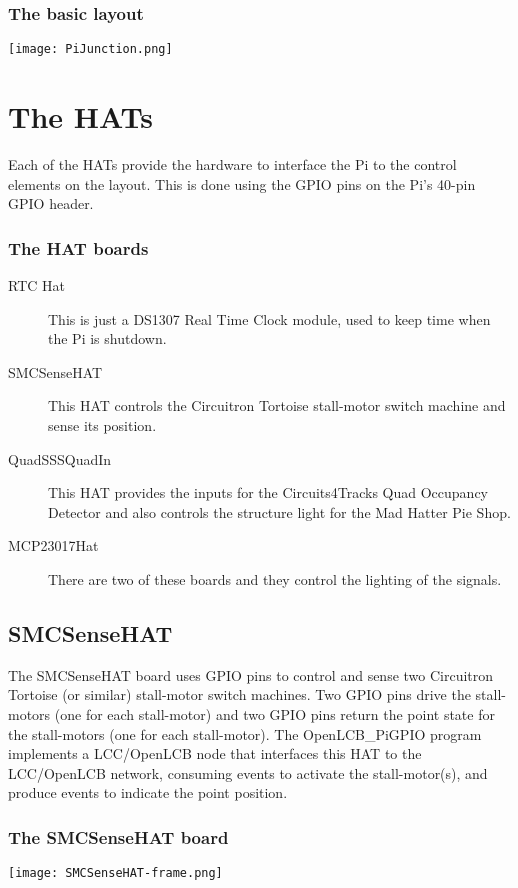 \begin{frame}
   \frametitle{The basic layout}
   \texttt{[image: PiJunction.png]}
\end{frame}

\section{The HATs}

Each of the HATs provide the hardware to interface the Pi to the control
elements on the layout. This is done using the GPIO pins on the Pi's 40-pin
GPIO header.  

\begin{frame}
   \frametitle{The HAT boards}
   \begin{description}
   \item[RTC Hat] This is just a DS1307 Real Time Clock module, used to keep 
   time when the Pi is shutdown.
   \item[SMCSenseHAT] This HAT controls the Circuitron Tortoise stall-motor 
   switch machine and sense its position.
   \item[QuadSSSQuadIn] This HAT provides the inputs for the Circuits4Tracks 
   Quad Occupancy Detector and also controls the structure light for the Mad 
   Hatter Pie Shop.
   \item[MCP23017Hat] There are two of these boards and they control the 
   lighting of the signals.
   \end{description}
\end{frame}

\subsection{SMCSenseHAT}

The SMCSenseHAT board uses GPIO pins to control and sense two Circuitron
Tortoise (or similar) stall-motor switch machines. Two GPIO pins drive the
stall-motors (one for each stall-motor) and two GPIO pins return the point
state for the stall-motors (one for each stall-motor). The OpenLCB\_PiGPIO
program implements a LCC/OpenLCB node that interfaces this HAT to the
LCC/OpenLCB network, consuming events to activate the stall-motor(s), and
produce events to indicate the point position.

\begin{frame}
    \frametitle{The SMCSenseHAT board}
    \texttt{[image: SMCSenseHAT-frame.png]}
\end{frame}

